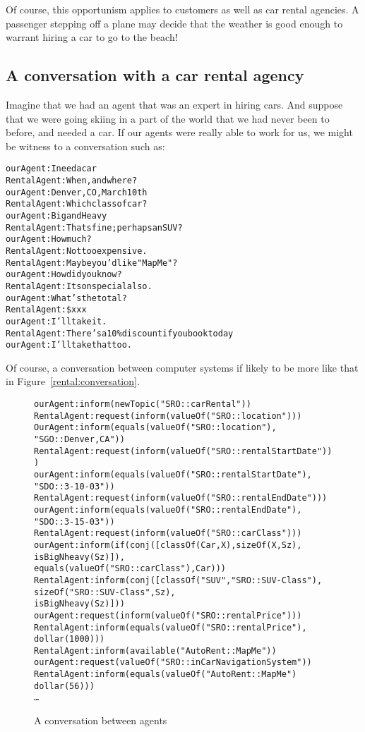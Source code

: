 Of course, this opportunism applies to customers as well as car rental agencies. A passenger stepping off a plane may decide that the weather is good enough to warrant hiring a car to go to the beach!

\subsection{A conversation with a car rental agency}
Imagine that we had an agent that was an expert in hiring cars. And suppose that we were going skiing in a part of the world that we had never been to before, and needed a car. If our agents were really able to work for us, we might be witness to a conversation such as:
\begin{alltt}
ourAgent: I need a car
  RentalAgent: When, and where?
ourAgent: Denver, CO, March 10th
  RentalAgent: Which class of car?
ourAgent: Big and Heavy
  RentalAgent: Thats fine; perhaps an SUV?
ourAgent: How much?
  RentalAgent: Not too expensive. 
  RentalAgent: Maybe you'd like "Map Me"\tm?
ourAgent: How did you know?
  RentalAgent: Its on special also.
ourAgent: What's the total?
  RentalAgent: \$xxx
ourAgent: I'll take it.
  RentalAgent: There's a 10\% discount if you book today
ourAgent: I'll take that too.
\end{alltt}
Of course, a conversation between computer systems if likely to be more like that in Figure~\vref{rental:conversation}.
\begin{figure}
\begin{alltt}
ourAgent: inform(newTopic("SRO::carRental"))
  RentalAgent: request(inform(valueOf("SRO::location")))
OurAgent: inform(equals(valueOf("SRO::location"),
                        "SGO::Denver,CA"))
  RentalAgent: request(inform(valueOf("SRO::rentalStartDate")))
ourAgent: inform(equals(valueOf("SRO::rentalStartDate"),
                        "SDO::3-10-03"))
  RentalAgent: request(inform(valueOf("SRO::rentalEndDate")))
ourAgent: inform(equals(valueOf("SRO::rentalEndDate"),
                        "SDO::3-15-03"))
  RentalAgent: request(inform(valueOf("SRO::carClass")))
ourAgent: inform(if(conj([classOf(Car,X),sizeOf(X,Sz),
                          isBigNheavy(Sz)]),
                   equals(valueOf("SRO::carClass"),Car)))
  RentalAgent: inform(conj([classOf("SUV","SRO::SUV-Class"),
                          sizeOf("SRO::SUV-Class",Sz),
                          isBigNheavy(Sz)]))
ourAgent: request(inform(valueOf("SRO::rentalPrice")))
  RentalAgent: inform(equals(valueOf("SRO::rentalPrice"),
                             dollar(1000)))
  RentalAgent: inform(available("AutoRent::MapMe"))
ourAgent: request(valueOf("SRO::inCarNavigationSystem"))
  RentalAgent: inform(equals(valueOf("AutoRent::MapMe")
                             dollar(56)))
\ldots  
\end{alltt}
\caption{A conversation between agents\label{rental:conversation}}
\end{figure}

